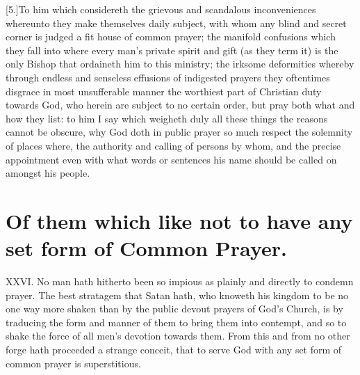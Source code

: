 [5.]To him which considereth the grievous and scandalous inconveniences whereunto they make themselves daily subject, with whom any blind and secret corner is judged a fit house of common prayer; the manifold confusions which they fall into where every man’s private spirit and gift (as they term it) is the only Bishop that ordaineth him to this ministry; the irksome deformities whereby through endless and senseless effusions of indigested prayers they oftentimes disgrace in most unsufferable manner the worthiest part of Christian duty towards God, who herein are subject to no certain order, but pray both what and how they list: to him I say which weigheth duly all these things the reasons cannot be obscure, why God doth in public prayer so much respect the solemnity of places where, the authority and calling of persons by whom, and the precise appointment even with what words or sentences his name should be called on amongst his people.


\section*{Of them which like not to have any set form of Common Prayer.}
XXVI. No man hath hitherto been so impious as plainly and directly to condemn prayer. The best stratagem that Satan hath, who knoweth his kingdom to be no one way more  shaken than by the public devout prayers of God’s Church, is by traducing the form and manner of them to bring them into contempt, and so to shake the force of all men’s devotion towards them.
 From this and from no other forge hath proceeded a strange conceit, that to serve God with any set form of common prayer is superstitious.

